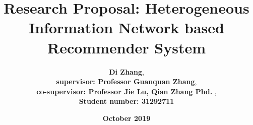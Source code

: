 \documentclass[12pt,a4 paper,title page]{article}
\title{Research Proposal: Heterogeneous Information Network based Recommender System}
\author{\large\textbf{Di Zhang}, \\
\textbf{supervisor: Professor Guanquan Zhang}, \\
\textbf{co-supervisor: Professor Jie Lu, Qian Zhang Phd. }, \\
\textbf{Student number: 31292711}}
\date{\Large{\textbf{October 2019}}}
\theoremstyle{definition}
\begin{document}
\sloppy
\maketitle

\tableofcontents
\newpage













\clearpage


\end{document}
